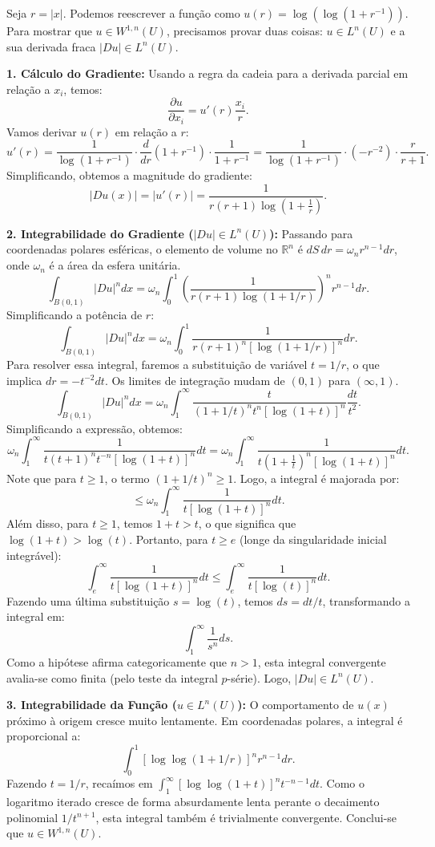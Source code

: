 \documentclass[cs_edp_2026.1.tex]{subfiles} %
\begin{document}
{	Seja $r = |x|$. Podemos reescrever a função como $u(r) = \log\left(\log\left(1 + r^{-1}\right)\right)$.
	Para mostrar que $u \in W^{1,n}(U)$, precisamos provar duas coisas: $u \in L^n(U)$ e a sua derivada fraca $|Du| \in L^n(U)$.
	
	\textbf{1. Cálculo do Gradiente:}
	Usando a regra da cadeia para a derivada parcial em relação a $x_i$, temos:
	$$\frac{\partial u}{\partial x_i} = u'(r) \frac{x_i}{r}.$$
	Vamos derivar $u(r)$ em relação a $r$:
	$$u'(r) = \frac{1}{\log(1 + r^{-1})} \cdot \frac{d}{dr}\left(1 + r^{-1}\right) \cdot \frac{1}{1 + r^{-1}} = \frac{1}{\log(1 + r^{-1})} \cdot (-r^{-2}) \cdot \frac{r}{r+1}.$$
	Simplificando, obtemos a magnitude do gradiente:
	$$|Du(x)| = |u'(r)| = \frac{1}{r(r+1)\log\left(1 + \frac{1}{r}\right)}.$$
	
	\textbf{2. Integrabilidade do Gradiente ($|Du| \in L^n(U)$):}
	Passando para coordenadas polares esféricas, o elemento de volume no $\mathbb{R}^n$ é $dS\, dr = \omega_n r^{n-1} dr$, onde $\omega_n$ é a área da esfera unitária.
	$$\int_{B(0,1)} |Du|^n dx = \omega_n \int_0^1 \left( \frac{1}{r(r+1)\log(1 + 1/r)} \right)^n r^{n-1} dr.$$
	Simplificando a potência de $r$:
	$$\int_{B(0,1)} |Du|^n dx = \omega_n \int_0^1 \frac{1}{r (r+1)^n \left[\log(1 + 1/r)\right]^n} dr.$$
	Para resolver essa integral, faremos a substituição de variável $t = 1/r$, o que implica $dr = -t^{-2} dt$. Os limites de integração mudam de $(0, 1)$ para $(\infty, 1)$.
	$$\int_{B(0,1)} |Du|^n dx = \omega_n \int_1^\infty \frac{t}{(1+1/t)^n t^n [\log(1+t)]^n} \frac{dt}{t^2}.$$
	Simplificando a expressão, obtemos:
	$$\omega_n \int_1^\infty \frac{1}{t (t+1)^n t^{-n} [\log(1+t)]^n} dt = \omega_n \int_1^\infty \frac{1}{t \left(1 + \frac{1}{t}\right)^n [\log(1+t)]^n} dt.$$
	Note que para $t \ge 1$, o termo $\left(1 + 1/t\right)^n \ge 1$. Logo, a integral é majorada por:
	$$\le \omega_n \int_1^\infty \frac{1}{t [\log(1+t)]^n} dt.$$
	Além disso, para $t \ge 1$, temos $1+t > t$, o que significa que $\log(1+t) > \log(t)$. Portanto, para $t \ge e$ (longe da singularidade inicial integrável):
	$$\int_e^\infty \frac{1}{t [\log(1+t)]^n} dt \le \int_e^\infty \frac{1}{t [\log(t)]^n} dt.$$
	Fazendo uma última substituição $s = \log(t)$, temos $ds = dt/t$, transformando a integral em:
	$$\int_1^\infty \frac{1}{s^n} ds.$$
	Como a hipótese afirma categoricamente que $\boxed{n > 1}$, esta integral convergente avalia-se como finita (pelo teste da integral $p$-série). Logo, $|Du| \in L^n(U)$.
	
	\textbf{3. Integrabilidade da Função ($u \in L^n(U)$):}
	O comportamento de $u(x)$ próximo à origem cresce muito lentamente. Em coordenadas polares, a integral é proporcional a:
	$$\int_0^1 \left[\log\log(1 + 1/r)\right]^n r^{n-1} dr.$$
	Fazendo $t = 1/r$, recaímos em $\int_1^\infty [\log\log(1+t)]^n t^{-n-1} dt$. Como o logaritmo iterado cresce de forma absurdamente lenta perante o decaimento polinomial $1/t^{n+1}$, esta integral também é trivialmente convergente. Conclui-se que $u \in W^{1,n}(U)$.
}
\end{document}
